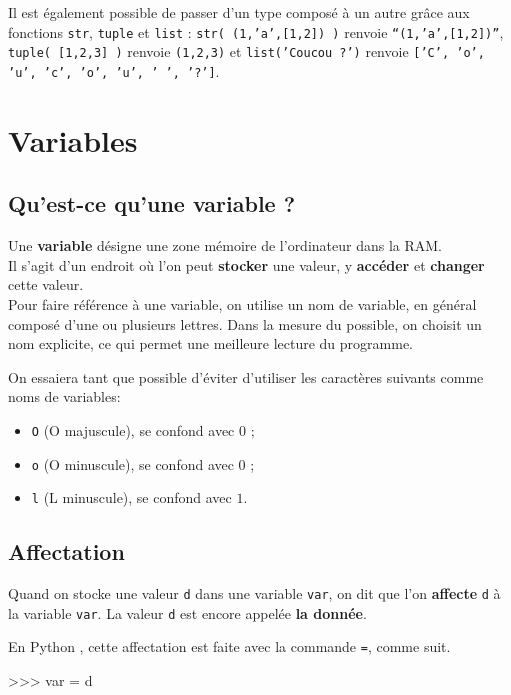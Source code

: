 Il est également possible de passer d'un type composé à un autre grâce aux fonctions \texttt{str}, 
\texttt{tuple} et \texttt{list} : \texttt{str( (1,'a',[1,2]) )} renvoie \texttt{``(1,'a',[1,2])''}, 
\texttt{tuple( [1,2,3] )} renvoie \texttt{(1,2,3)} et \texttt{list('Coucou ?')} renvoie 
\texttt{['C', 'o', 'u', 'c', 'o', 'u', ' ', '?']}.


\section{Variables}

\subsection{Qu'est-ce qu'une variable ?}

Une \textbf{variable} désigne une zone mémoire de l'ordinateur dans la RAM.\\
Il s'agit d'un endroit où l'on peut \textbf{stocker} une valeur, y \textbf{accéder} et 
\textbf{changer} cette valeur.\\

Pour faire référence à une variable, on utilise un nom de variable, en général composé d'une ou 
plusieurs lettres. Dans la mesure du possible, on choisit un nom explicite, ce qui permet une 
meilleure lecture du programme.

On essaiera tant que possible d'éviter d'utiliser les caractères suivants comme noms de variables:
\begin{itemize}
  \item \texttt{O} (O majuscule), se confond avec $0$ ;
  \item \texttt{o} (O minuscule), se confond avec $0$ ;
  \item \texttt{l} (L minuscule), se confond avec $1$. 
\end{itemize}


\subsection{Affectation}

Quand on stocke une valeur \texttt{d} dans une variable \texttt{var}, on dit que l'on 
\textbf{affecte} \texttt{d} à la variable \texttt{var}. La valeur
\texttt{d} est encore appelée \textbf{la donnée}.

En Python , cette affectation est faite avec la commande \texttt{=}, comme suit.  

\begin{pyconsole}
>>> var  = d
\end{pyconsole}


